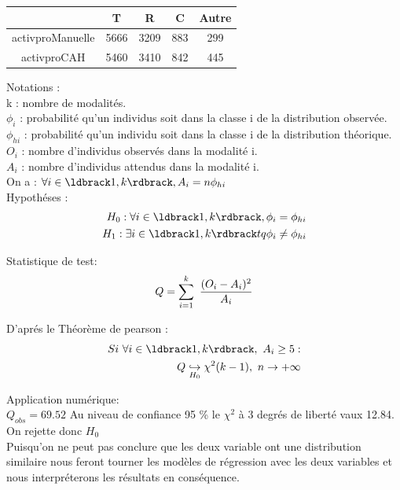 \documentclass{book}
\begin{document}
\begin{center}
\setlength\arrayrulewidth{.5pt}
\begin{tabular}{|c||c|c|c|c|}
\hline
	& T & R & C & Autre\\
\hline
\hline
activproManuelle & 5666 & 3209 & 883 & 299\\
\hline
activproCAH & 5460 & 3410 & 842 & 445\\
\hline
\end{tabular}
\end{center}
\noindent
Notations : \\
k : nombre de modalités.\\
$\phi_i$ : probabilité qu'un individus soit dans la classe i de la distribution observée.\\ 
$\phi_{hi}$ : probabilité qu'un individu soit dans la classe i de la distribution théorique.\\
$O_i$ : nombre d'individus observés dans la modalité i.\\
$A_i$ : nombre d'individus attendus dans la modalité i.\\
On a : $\forall i \in \ldbrack 1,k \rdbrack , A_i = n \phi_{hi}$\\

\noindent
Hypothéses :
\begin{equation}
\begin{split}
H_0 : \forall i \in \ldbrack 1,k \rdbrack ,\phi_i = \phi_{hi}\\
H_1 : \exists i \in \ldbrack 1,k \rdbrack tq \phi_i \neq \phi_{hi}
\end{split}
\end{equation}

\noindent
Statistique de test:
\begin{equation}
Q = \sum_{i=1}^k ~{{(O_i - A _i)^2} \over {A_i}}
\end{equation}

\noindent
D'aprés le Théorème de pearson : 
\begin{equation}
\begin{split}
Si ~\forall i  \in \ldbrack 1,k \rdbrack, ~ A_i \geq 5 :\\
Q \underset {\small{H_0}}{\hookrightarrow} \chi ^{2} (k-1) , ~ n \rightarrow +\infty
\end{split}
\end{equation}

\noindent
Application numérique: \\
 $Q_{obs} = 69.52$ 
Au niveau de confiance 95 \% le $\chi ^2$ à 3 degrés de liberté vaux 12.84.\\
On rejette donc $H_0$
\\
\noindent
Puisqu'on ne peut pas conclure que les deux variable ont une distribution similaire nous feront tourner les modèles de régression avec les deux variables et nous interpréterons les résultats en conséquence.\\
\end{document}
